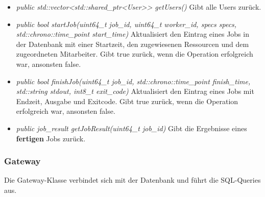 \documentclass[a4paper,12pt]{article}
\begin{document}
\begin{itemize}[label={}]
\begin{itemize}[label={\textbullet}]
				\item \textit{public std::vector<std::shared\_ptr<User>> getUsers()} Gibt alle Users zurück.
				
				\item \textit{public bool startJob(uint64\_t job\_id, uint64\_t worker\_id, specs specs, std::chrono::time\_point start\_time)} Aktualisiert den Eintrag eines Jobs in der Datenbank mit einer Startzeit, den zugewiesenen Ressourcen und dem zugeordneten Mitarbeiter. Gibt true zurück, wenn die Operation erfolgreich war, ansonsten false.
				
				\item \textit{public bool finishJob(uint64\_t job\_id, std::chrono::time\_point finish\_time, std::string stdout, int8\_t exit\_code)} Aktualisiert den Eintrag eines Jobs mit Endzeit, Ausgabe und Exitcode. Gibt true zurück, wenn die Operation erfolgreich war, ansonsten false.
				
				\item \textit{public job\_result getJobResult(uint64\_t job\_id)} Gibt die Ergebnisse eines \textbf{fertigen} Jobs zurück.
								
			\end{itemize}
			
	\end{itemize}
\subsubsection{Gateway}

Die Gateway-Klasse verbindet sich mit der Datenbank und führt die SQL-Queries aus.
\end{document}
